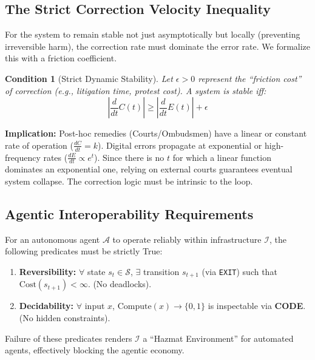 \documentclass{article}
\newtheorem{condition}{Condition}
\begin{document}
\subsection{The Strict Correction Velocity Inequality}

For the system to remain stable not just asymptotically but locally (preventing irreversible harm), the correction rate must dominate the error rate. We formalize this with a friction coefficient.

\begin{condition}[Strict Dynamic Stability]
Let $\epsilon > 0$ represent the ``friction cost'' of correction (e.g., litigation time, protest cost). A system is stable iff:
\begin{equation}
\left| \frac{d}{dt} C(t) \right| \ge \left| \frac{d}{dt} E(t) \right| + \epsilon
\end{equation}
\end{condition}

\textbf{Implication:} Post-hoc remedies (Courts/Ombudsmen) have a linear or constant rate of operation ($\frac{dC}{dt} = k$). Digital errors propagate at exponential or high-frequency rates ($\frac{dE}{dt} \propto e^{t}$). Since there is no $t$ for which a linear function dominates an exponential one, relying on external courts guarantees eventual system collapse. The correction logic must be intrinsic to the loop.

\subsection{Agentic Interoperability Requirements}

For an autonomous agent $\mathcal{A}$ to operate reliably within infrastructure $\mathcal{I}$, the following predicates must be strictly True:

\begin{enumerate}
    \item \textbf{Reversibility:} $\forall$ state $s_t \in \mathcal{S}$, $\exists$ transition $s_{t+1}$ (via \texttt{EXIT}) such that $\text{Cost}(s_{t+1}) < \infty$. (No deadlocks).
    \item \textbf{Decidability:} $\forall$ input $x$, $\text{Compute}(x) \to \{0,1\}$ is inspectable via \textbf{CODE}. (No hidden constraints).
\end{enumerate}

Failure of these predicates renders $\mathcal{I}$ a ``Hazmat Environment'' for automated agents, effectively blocking the agentic economy.
\end{document}
